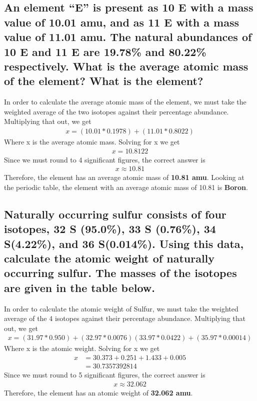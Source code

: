\documentclass[11pt]{article}
\begin{document}
\subsection{An element “E” is present as 10 E with a mass value of 10.01 amu, and as 11 E with a mass value of 11.01 amu. The natural abundances of 10 E and 11 E are 19.78\% and 80.22\% respectively. What is the average atomic mass of the element? What is the element?}
\label{sec:org77a71f4}
In order to calculate the average atomic mass of the element, we must take the weighted average of the two isotopes against their percentage abundance. Multiplying that out, we get
\begin{align*}
x=(10.01*0.1978)+(11.01*0.8022)
\end{align*}
Where x is the average atomic mass. Solving for x we get
\begin{align*}
x=10.8122
\end{align*}
Since we must round to 4 significant figures, the correct answer is
\begin{align*}
x\approx10.81
\end{align*}
Therefore, the element has an average atomic mass of \textbf{10.81 amu}. Looking at the periodic table, the element with an average atomic mass of 10.81 is \textbf{Boron}.

\subsection{Naturally occurring sulfur consists of four isotopes, 32 S (95.0\%), 33 S (0.76\%), 34 S(4.22\%), and 36 S(0.014\%). Using this data, calculate the atomic weight of naturally occurring sulfur. The masses of the isotopes are given in the table below.}
\label{sec:org5f5bda4}
In order to calculate the atomic weight of Sulfur, we must take the weighted average of the 4 isotopes against their percentage abundance. Multiplying that out, we get
\begin{align*}
x=(31.97*0.950)+(32.97*0.0076)(33.97*0.0422)+(35.97*0.00014)
\end{align*}
Where x is the atomic weight. Solving for x we get
\begin{align*}
x&=30.373 + 0.251 + 1.433 + 0.005\\
&=30.7357392814
\end{align*}
Since we must round to 5 significant figures, the correct answer is
\begin{align*}
x\approx32.062
\end{align*}
Therefore, the element has an atomic weight of \textbf{32.062 amu}.
\end{document}

